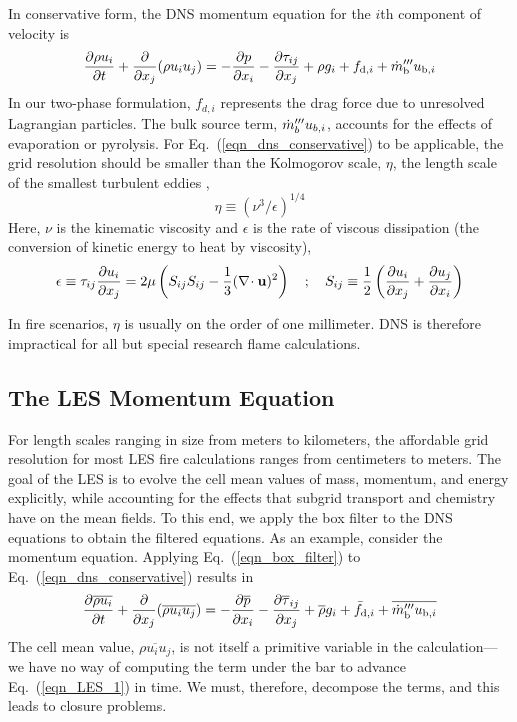 In conservative form, the DNS momentum equation for the $i$th component of velocity is
\begin{equation}
\label{eqn_dns_conservative}
\frac{\partial \rho u_i}{\partial t} + \frac{\partial}{\partial x_j} (\rho u_i u_j) = -\frac{\partial p}{\partial x_i} - \frac{\partial \tau_{ij}}{\partial x_j} + \rho g_i + f_{{\rm d},i} + \dot{m}_{\rm b}^{\prime\prime\prime} u_{{\rm b},i}
\end{equation}
In our two-phase formulation, $f_{d,i}$ represents the drag force due to unresolved Lagrangian particles.  The bulk source term, $\dot{m}_b^{\prime\prime\prime} u_{b,i}$, accounts for the effects of evaporation or pyrolysis. For Eq.~(\ref{eqn_dns_conservative}) to be applicable, the grid resolution should be smaller than the Kolmogorov scale, $\eta$, the length scale of the smallest turbulent eddies \cite{Pope:2000},
\begin{equation}
\label{eqn_kolmogorov_scale}
\eta \equiv (\nu^3/\epsilon)^{1/4}
\end{equation}
Here, $\nu$ is the kinematic viscosity and $\epsilon$ is the rate of viscous dissipation (the conversion of kinetic energy to heat by viscosity),
\begin{equation}
\epsilon \equiv \tau_{ij} \frac{\partial u_i}{\partial x_j} = 2 \mu \left( S_{ij} S_{ij} - \frac{1}{3} (\nabla\!\cdot {\mathbf{u}})^2 \right) \quad ; \quad S_{ij} \equiv \frac{1}{2}\left(\frac{\partial u_i}{\partial x_j} + \frac{\partial u_j}{\partial x_i}\right)
\end{equation}

In fire scenarios, $\eta$ is usually on the order of one millimeter.  DNS is therefore impractical for all but special research flame calculations.

\subsection{The LES Momentum Equation}

For length scales ranging in size from meters to kilometers, the affordable grid resolution for most LES fire calculations ranges from centimeters to meters.  The goal of the LES is to evolve the cell mean values of mass, momentum, and energy explicitly, while accounting for the effects that subgrid transport and chemistry have on the mean fields.  To this end, we apply the box filter to the DNS equations to obtain the filtered equations.  As an example, consider the momentum equation.  Applying Eq.~(\ref{eqn_box_filter}) to Eq.~(\ref{eqn_dns_conservative}) results in
\begin{equation}
\label{eqn_LES_1}
\frac{\partial \overline{\rho u_i}}{\partial t} + \frac{\partial}{\partial x_j} (\overline{\rho u_i u_j}) = -\frac{\partial \overline{p}}{\partial x_i} - \frac{\partial \overline{\tau}_{ij}}{\partial x_j} + \overline{\rho} g_i + \bar{f}_{{\rm d},i} + \overline{\dot{m}_{\rm b}^{\prime\prime\prime} u_{{\rm b},i}}
\end{equation}
The cell mean value, $\overline{\rho u_i u_j}$, is not itself a primitive variable in the calculation---we have no way of computing the term under the bar to advance Eq.~(\ref{eqn_LES_1}) in time.  We must, therefore, decompose the terms, and this leads to closure problems.

